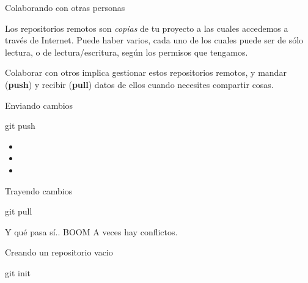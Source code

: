 \begin{frame}{Colaborando con otras personas}

    Los repositorios remotos son \textit{copias} de tu proyecto a las cuales accedemos a través
    de Internet. Puede haber varios, cada uno de los cuales
    puede ser de sólo lectura, o de lectura/escritura, según los permisos que tengamos.

    \vspace{0.5em}

    Colaborar con otros implica gestionar estos repositorios remotos, y mandar (\textbf{push}) y recibir (\textbf{pull})
    datos de ellos cuando necesites compartir cosas.

\end{frame}

\begin{frame}[t]{Enviando cambios}
    \begin{comando}
        git push
    \end{comando}

    \begin{block}{}
        \begin{itemize}
            \item
            \item
            \item
        \end{itemize}
    \end{block}
\end{frame}

\begin{frame}[t]{Trayendo cambios}
    \begin{comando}
        git pull
    \end{comando}
\end{frame}

\begin{frame}[t]{Y qué pasa sí.. BOOM}
    A veces hay conflictos.

\end{frame}

\begin{frame}[t]{Creando un repositorio vacio}
    \begin{comando}
        git init
    \end{comando}
\end{frame}

